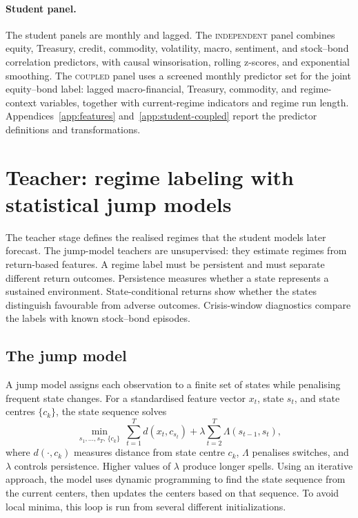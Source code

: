 \documentclass[10pt]{article}
\newcommand{\Acoup}{\textsc{coupled}}
\newcommand{\Bindep}{\textsc{independent}}
\begin{document}
\paragraph{Student panel.}
The student panels are monthly and lagged. The \Bindep{} panel combines equity, Treasury,
credit, commodity, volatility, macro, sentiment, and stock--bond correlation predictors,
with causal winsorisation, rolling z-scores, and exponential smoothing. The \Acoup{} panel
uses a screened monthly predictor set for the joint equity--bond label: lagged macro-financial,
Treasury, commodity, and regime-context variables, together with current-regime indicators
and regime run length. Appendices~\ref{app:features} and~\ref{app:student-coupled} report
the predictor definitions and transformations.

\section{Teacher: regime labeling with statistical jump models}
\label{sec:teacher}

The teacher stage defines the realised regimes that the student models later forecast. The
jump-model teachers are unsupervised: they estimate regimes from return-based features. A regime label must be persistent and must
separate different return outcomes. Persistence measures whether a state represents a
sustained environment. State-conditional returns show whether the states distinguish
favourable from adverse outcomes. Crisis-window diagnostics compare the labels with known
stock--bond episodes.


\subsection{The jump model}

A jump model assigns each observation to a finite set of states while penalising frequent state changes. For a standardised feature vector \(x_t\), state \(s_t\), and state centres \(\{c_k\}\), the state sequence solves
\begin{equation}
    \min_{s_1,\dots,s_T,\,\{c_k\}}\
    \sum_{t=1}^{T} d(x_t,c_{s_t})
    +
    \lambda\sum_{t=2}^{T}\Lambda(s_{t-1},s_t),
    \label{eq:jump-generic}
\end{equation}
where \(d(\cdot,c_k)\) measures distance from state centre \(c_k\), \(\Lambda\) penalises switches, and \(\lambda\) controls persistence. Higher values of \(\lambda\) produce longer spells. Using an iterative approach, the model uses dynamic programming to find the state sequence from the current centers, then updates the centers based on that sequence. To avoid local minima, this loop is run from several different initializations.
\end{document}

